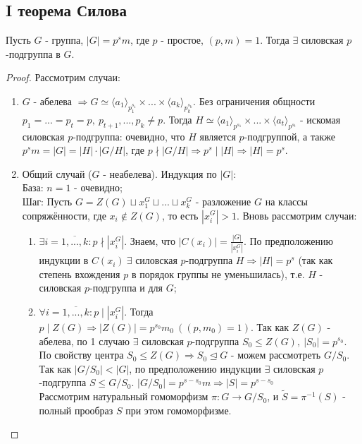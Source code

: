 \subsection{I теорема Силова}
    Пусть $G$ - группа, $|G| = p^sm$, где $p$ - простое, $(p, m) = 1$. Тогда $\exists$ силовская $p$-подгруппа в $G$.
\begin{proof}
    Рассмотрим случаи:
    \begin{enumerate}
        \item $G$ - абелева $\Longrightarrow G \simeq \langle a_1 \rangle_{p_1^{s_1}} \times ... \times \langle a_k \rangle_{p_k^{s_k}}$. Без ограничения общности $p_1 = ... = p_t = p,\ p_{t+1},...,p_k \neq p$. Тогда $H \simeq \langle a_1 \rangle_{p^{s_1}} \times ... \times \langle a_t \rangle_{p^{s_t}}$ - искомая силовская $p$-подгруппа: очевидно, что $H$ является $p$-подгруппой, а также $p^sm = |G| = |H|\cdot|G/H|$, где $p \nmid |G/H| \Longrightarrow p^s \mid |H| \Longrightarrow |H| = p^s$.
        \item Общий случай ($G$ - неабелева). Индукция по $|G|$:\\
        База: $n = 1$ - очевидно;\\
        Шаг: Пусть $G = Z(G) \sqcup x_1^G \sqcup ... \sqcup x_k^G$ - разложение $G$ на классы сопряжённости, где $x_i \notin Z(G)$, то есть $|x_i^G| > 1$. Вновь рассмотрим случаи:
        \begin{enumerate}
            \item $\exists i = \overline{1,...,k}: p \nmid |x_i^G|$. Знаем, что $|C(x_i)| = \frac{|G|}{|x_i^G|}$. По предположению индукции в $C(x_i) \ \exists$ силовская $p$-подгруппа $H \Longrightarrow |H| = p^s$ (так как степень вхождения $p$ в порядок группы не уменьшилась), т.е. $H$ - силовская $p$-подгруппа и для $G$;
            \item $\forall i = \overline{1,...,k}: p \mid |x_i^G|$. Тогда $p \mid Z(G) \Longrightarrow |Z(G)| = p^{s_0}m_0 \ ((p, m_0) = 1)$. Так как $Z(G)$ - абелева, по 1 случаю $\exists$ силовская $p$-подгруппа $S_0 \leq Z(G), \ |S_0| = p^{s_0}$.\\
            По свойству центра $S_0 \leq Z(G) \Longrightarrow S_0 \unlhd G$ - можем рассмотреть $G/S_0$.
            Так как $|G/S_0| < |G|$, по предположению индукции $\exists$ силовская $p$-подгруппа $S \leq G/S_0$. $|G/S_0| = p^{s-s_0}m \Longrightarrow |S| = p^{s-s_0}$\\
            Рассмотрим натуральный гомоморфизм $\pi: G \rightarrow G/S_0$, и $\tilde{S} = \pi^{-1}(S)$ - полный прообраз $S$ при этом гомоморфизме.\\

\end{enumerate}
\end{enumerate}
\end{proof}
